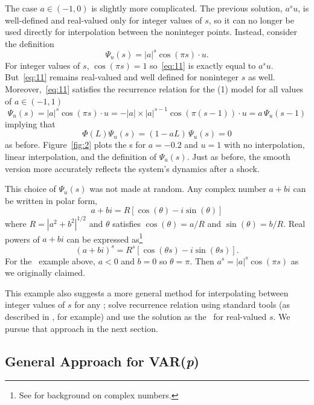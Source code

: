 \documentclass[12pt,fleqn]{article}
\begin{document}
The case $a \in (-1, 0)$ is slightly more complicated.  The previous
solution, $a^s u$, is well-defined and real-valued only for integer
values of $s$, so it can no longer be used directly for interpolation
between the noninteger points. Instead, consider the definition
\begin{equation}
  \label{eq:11}
  \Psi_u(s) = |a|^s \cos(\pi s) \cdot u.
\end{equation}
For integer values of $s$, $\cos(\pi s) = 1$ so~\eqref{eq:11} is
exactly equal to $a^s u$. But~\eqref{eq:11} remains real-valued and
well defined for noninteger $s$ as well. Moreover,~\eqref{eq:11}
satisfies the recurrence relation for the \AR(1) model for all values
of $a \in (-1,1)$
\begin{equation*}
  \Psi_u(s) = |a|^s \cos(\pi s) \cdot u = - |a| \times |a|^{s-1} \cos(\pi (s-1)) \cdot u = a \, \Psi_u(s-1)
\end{equation*}
implying that
\begin{equation*}
  \Phi(L) \Psi_u(s) = (1 - a L) \, \Psi_u(s) = 0
\end{equation*}
as before. Figure~\ref{fig:2} plots the \IRF s for $a = -0.2$ and
$u = 1$ with no interpolation, linear interpolation, and the
definition of $\Psi_u(s)$. Just as before, the smooth version more
accurately reflects the system's dynamics after a shock.

This choice of $\Psi_u(s)$ was not made at random. Any complex
number $a + bi$ can be written in polar form,
\[
a + bi = R [\cos(\theta) - i \sin(\theta)]
\]
where $R = |a^2 + b^2|^{1/2}$ and $\theta$ satisfies
$\cos(\theta) = a/R$ and $\sin(\theta) = b/R$. Real powers of $a + bi$
can be expressed as\footnote{%
  See \citet{Ham:94} for background on complex numbers.} %
\[
(a + bi)^s = R^s [\cos(\theta s) - i \sin(\theta s)].
\]
For the \AR\ example above, $a < 0$ and $b = 0$ so $\theta = \pi$.
Then $a^s = |a|^s \cos(\pi s)$ as we originally claimed.

This example also suggests a more general method for interpolating
between integer values of $s$ for any \VAR; solve recurrence relation
using standard tools (as described in \citealp{Ham:94}, for example)
and use the solution as the \IRF\ for real-valued $s$. We pursue that
approach in the next section.

\subsection{General Approach for VAR(\textit{p})}
\label{S2.2}
\end{document}
